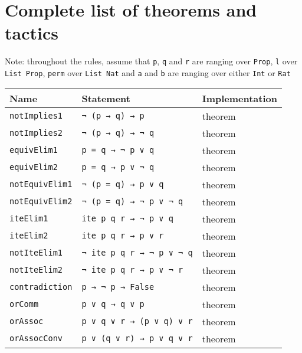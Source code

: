 \documentclass[
	msc,
	english
]{ppgccufmg}
\begin{document}
    \appendix
    \chapter{Complete list of theorems and tactics}

    Note: throughout the rules, assume that \texttt{p}, \texttt{q} and \texttt{r}
    are ranging over \texttt{Prop}, \texttt{l} over \texttt{List Prop}, \texttt{perm}
    over \texttt{List Nat} and \texttt{a} and \texttt{b} are ranging over either  \texttt{Int}
    or \texttt{Rat}


\begin{longtabu} to \textwidth { l l l }
\toprule
Name        & Statement & Implementation \\ \midrule
\texttt{notImplies1} & \texttt{¬ (p → q) → p} & theorem \\ \midrule
\texttt{notImplies2} & \texttt{¬ (p → q) → ¬ q}      & theorem        \\ \midrule
\texttt{equivElim1}  & \texttt{p = q → ¬ p ∨ q}      & theorem        \\ \midrule
\texttt{equivElim2}  & \texttt{p = q → p ∨ ¬ q}      & theorem        \\ \midrule
\texttt{notEquivElim1}  & \texttt{¬ (p = q) → p ∨ q}  & theorem        \\ \midrule
\texttt{notEquivElim2}  &  \texttt{¬ (p = q) → ¬ p ∨ ¬ q}      & theorem        \\ \midrule
\texttt{iteElim1} & \texttt{ite p q r → ¬ p ∨ q} & theorem \\ \midrule
\texttt{iteElim2} & \texttt{ite p q r → p ∨ r} & theorem \\ \midrule
\texttt{notIteElim1} & \texttt{¬ ite p q r → ¬ p ∨ ¬ q} & theorem \\ \midrule
\texttt{notIteElim2} & \texttt{¬ ite p q r → p ∨ ¬ r} & theorem \\ \midrule
\texttt{contradiction} & \texttt{p → ¬ p → False} & theorem \\ \midrule
\texttt{orComm} & \texttt{p ∨ q → q ∨ p} & theorem \\ \midrule
\texttt{orAssoc} & \texttt{p ∨ q ∨ r → (p ∨ q) ∨ r} & theorem \\ \midrule
\texttt{orAssocConv} & \texttt{p ∨ (q ∨ r) → p ∨ q ∨ r} & theorem \\ \midrule

\end{longtabu}
\end{document}
